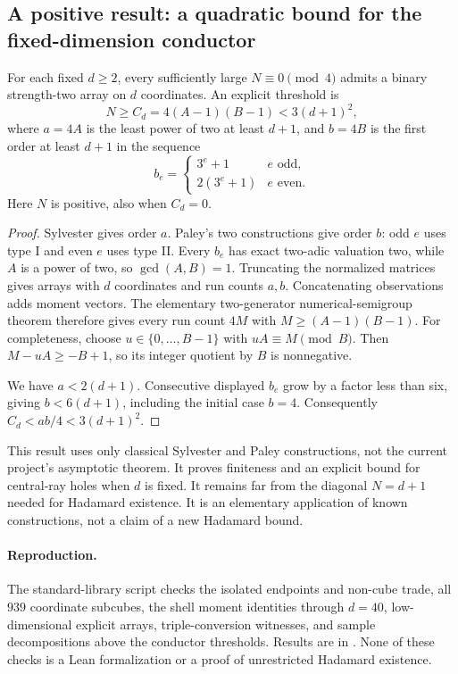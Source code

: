 \subsection{A positive result: a quadratic bound for the fixed-dimension conductor}
\begin{proposition}
For each fixed $d\ge2$, every sufficiently large $N\equiv0\pmod4$
admits a binary strength-two array on $d$ coordinates. An explicit
threshold is
\[
 N\ge C_d=4(A-1)(B-1)<3(d+1)^2,
\]
where $a=4A$ is the least power of two at least $d+1$, and $b=4B$ is
the first order at least $d+1$ in the sequence
\[
 b_e=\begin{cases}3^e+1&e\text{ odd},\\2(3^e+1)&e\text{ even}.
 \end{cases}
\]
Here $N$ is positive, also when $C_d=0$.
\end{proposition}
\begin{proof}
Sylvester gives order $a$. Paley's two constructions give order $b$:
odd $e$ uses type I and even $e$ uses type II. Every $b_e$ has exact
two-adic valuation two, while $A$ is a power of two, so $\gcd(A,B)=1$.
Truncating the normalized matrices gives arrays with $d$ coordinates
and run counts $a,b$. Concatenating observations adds moment vectors.
The elementary two-generator numerical-semigroup theorem therefore
gives every run count $4M$ with $M\ge(A-1)(B-1)$. For completeness,
choose $u\in\{0,\ldots,B-1\}$ with $uA\equiv M\pmod B$. Then
$M-uA\ge-B+1$, so its integer quotient by $B$ is nonnegative.

We have $a<2(d+1)$. Consecutive displayed $b_e$ grow by a factor less
than six, giving $b<6(d+1)$, including the initial case $b=4$.
Consequently $C_d<ab/4<3(d+1)^2$.
\end{proof}
This result uses only classical Sylvester and Paley constructions, not
the current project's asymptotic theorem. It proves finiteness and an
explicit bound for central-ray holes when $d$ is fixed. It remains far
from the diagonal $N=d+1$ needed for Hadamard existence. It is an
elementary application of known constructions, not a claim of a new
Hadamard bound.

\paragraph{Reproduction.}
The standard-library script  checks the isolated
endpoints and non-cube trade, all $939$ coordinate subcubes, the shell
moment identities through $d=40$, low-dimensional explicit arrays,
triple-conversion witnesses, and sample decompositions above the
conductor thresholds. Results are in .
None of these checks is a Lean formalization or a proof of unrestricted
Hadamard existence.
